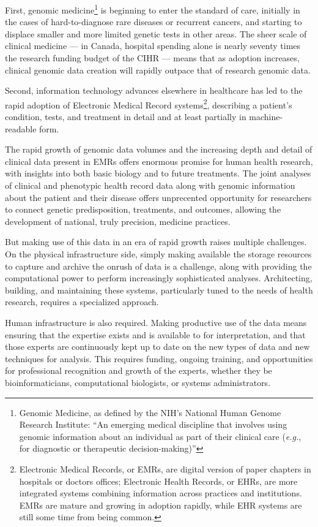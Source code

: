 \documentclass[twoside,symmetric,sfsidenotes,notoc]{tufte-book}
\begin{document}
First, genomic medicine\footnote{Genomic Medicine, as defined by the NIH's
National Human Genome Research Institute: ``An emerging medical discipline
that involves using genomic information about an individual as part of their
clinical care (\textit{e.g.}, for diagnostic or therapeutic decision-making)''} is beginning
to enter the standard of care, initially in the cases of hard-to-diagnose
rare diseases or recurrent cancers, and starting to displace smaller
and more limited genetic tests in other areas.  The sheer scale of clinical medicine 
--- in Canada, hospital spending alone is nearly seventy times the research funding
budget of the CIHR --- means that as adoption increases, clinical
genomic data creation will rapidly outpace that of research genomic data.

Second, information technology advances elsewhere in healthcare
has led to the rapid adoption of Electronic Medical Record systems\footnote{
Electronic Medical Records, or EMRs, are digital version of paper chapters
in hospitals or doctors offices; Electronic Health Records, or EHRs, are
more integrated systems combining information across practices and institutions.
EMRs are mature and growing in adoption rapidly, while EHR systems are still
some time from being common.}, describing a patient's condition, tests, and
treatment in detail and at least partially in machine-readable form.

The rapid growth of genomic data volumes and the increasing depth and detail
of clinical data present in EMRs offers enormous promise for human health research,
with insights into both basic biology and to future treatments.  The joint analyses
of clinical and phenotypic health record data along with genomic information 
about the patient and their disease offers unprecented opportunity for researchers
to connect genetic predisposition, treatments, and outcomes, allowing the
development of national, truly precision, medicine practices.

But making use of this data in an era of rapid growth raises multiple challenges.
On the physical infrastructure side, simply making available the storage 
resources to capture and archive the onrush of data is a challenge, along with
providing the computational power to perform increasingly sophisticated analyses.
Architecting, building, and maintaining these systems, particularly tuned to
the needs of health research, requires a specialized approach.

Human infrastructure is also required.  Making productive use of the 
data means ensuring that the expertise exists and is available to for interpretation,
and that those experts are continuously kept up to date on the new types of data
and new techniques for analysis.  This requires funding, ongoing training,
and opportunities for professional recognition and growth of the experts, whether
they be bioinformaticians, computational biologists, or systems administrators.
\end{document}
